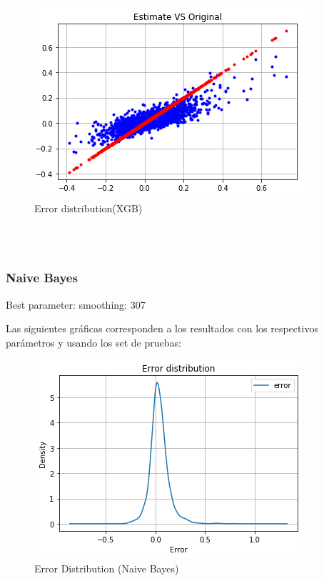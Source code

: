 \begin{figure}[h!]
	\centering
	\includegraphics[width=0.8\linewidth]{Figure/xgbregresorEstimation_results.png}
	\caption{Error distribution(XGB)} 
	\label{fig:xgbregresorEstimation_results}
\end{figure}
\\
\\
\newpage
\subsubsection{Naive Bayes}
Best parameter:
smoothing: 307

Las siguientes gr\'aficas corresponden a los resultados con los respectivos par\'ametros y usando los set de pruebas:
\begin{figure}[h!]
	\centering
	\includegraphics[width=0.8\linewidth]{Figure/nb_error_distribution.png}
	\caption{Error Distribution (Naive Bayes)} 
	\label{fig:nb1}
\end{figure}

